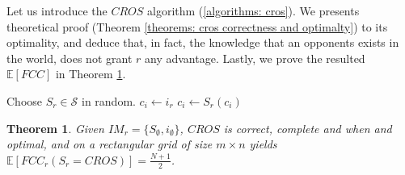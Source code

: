 \documentclass[letterpaper, 10 pt, conference]{ieeeconf}  %
\newtheorem{theorem}{Theorem}[section]
\newcommand\rob{\ensuremath{r}\xspace}
\newcommand{\fcc}{\ensuremath{FCC}\xspace}
\newcommand{\cros}{\ensuremath{CROS}\xspace}
\begin{document}
Let us introduce the \cros algorithm (\ref{algorithms: cros}). We presents theoretical proof (Theorem \ref{theorems: cros correctness and optimalty}) to its optimality, and deduce that, in fact, the knowledge that an opponents exists in the world, does not grant \rob any advantage. Lastly, we prove the resulted $\mathbb{E}[\fcc]$ in Theorem \ref{theorems: cros correctness, optimalty and fcc}.

\begin{algorithm}
\begin{algorithmic}
	\STATE Choose $S_\rob \in \mathcal{S}$ in random.
    \STATE $c_i \leftarrow i_\rob$
    \LOOP
    	\STATE $c_i \leftarrow S_\rob(c_i)$
    \ENDLOOP
  
\end{algorithmic}
\caption{\cros\label{algorithms: cros}}
\end{algorithm}

\begin{theorem} \label{theorems: cros correctness, optimalty and fcc}
Given $IM_\rob=\lbrace S_\emptyset, i_\emptyset \rbrace$, \cros is correct, complete and when and optimal, and on a rectangular grid of size $m\times n$ yields  $\mathbb{E}[\fcc_\rob(S_\rob=\cros)]=\frac{N+1}{2}$.
\end{theorem}

\end{document}
